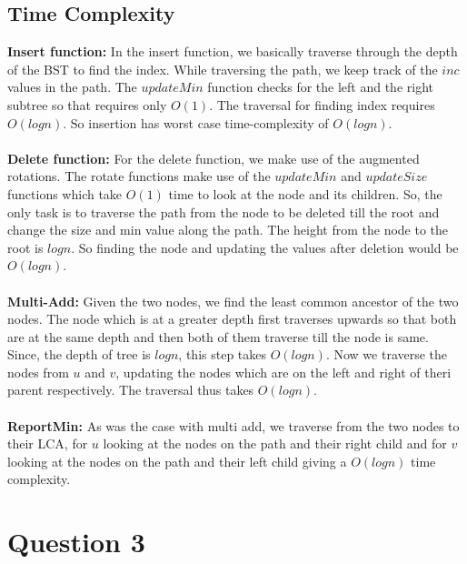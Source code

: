 \documentclass{article}
\begin{document}
\subsection*{Time Complexity}
\textbf{Insert function:} In the insert function, we basically traverse through the depth of the BST to find the index. While traversing the path, we keep track of the $inc$ values in the path. The $updateMin$ function checks for the left and the right subtree so that requires only $O(1)$. The traversal for finding index requires $O(log n)$. So insertion has worst case time-complexity of $O(log n)$. \\ \\
\textbf{Delete function:} For the delete function, we make use of the augmented rotations. The rotate functions make use of the $updateMin$ and $updateSize$ functions which take $O(1)$ time to look at the node and its children. So, the only task is to traverse the path from the node to be deleted till the root and change the size and min value along the path. The height from the node to the root is $log n$. So finding the node and updating the values after deletion would be $O(log n)$. \\ \\
\textbf{Multi-Add:} Given the two nodes, we find the least common ancestor of the two nodes. The node which is at a greater depth first traverses upwards so that both are at the same depth and then both of them traverse till the node is same. Since, the depth of tree is $log n$, this step takes $O(log n)$. Now we traverse the nodes from $u$ and $v$, updating the nodes which are on the left and right of theri parent respectively. The traversal thus takes $O(log n)$. \\ \\
\textbf{ReportMin: }As was the case with multi add, we traverse from the two nodes to their LCA, for $u$ looking at the nodes on the path and their right child and for $v$ looking at the nodes on the path and their left child giving a $O(log n)$ time complexity.



\clearpage



\section*{Question 3}
\end{document}
